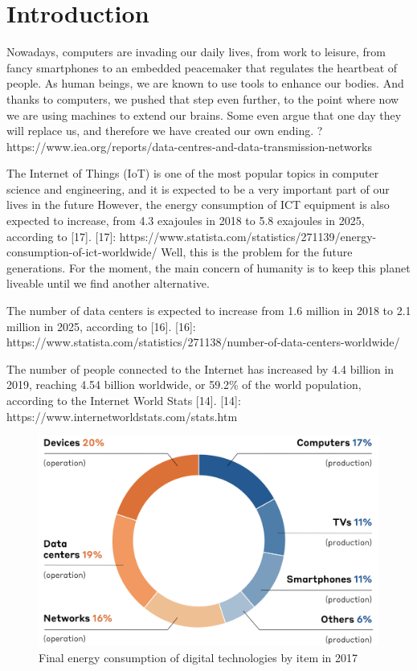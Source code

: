 \newpage

\chapter{Introduction }



\label{chapter:introduction}





Nowadays, computers are invading our daily lives, from work to leisure, from fancy smartphones to an embedded peacemaker that regulates the heartbeat of people.
As human beings, we are known to use tools to enhance our bodies. And thanks to computers, we pushed that step even further, to the point where now we are using machines to extend our brains. Some even argue that one day they will replace us, and therefore we have created our own ending.
?
https://www.iea.org/reports/data-centres-and-data-transmission-networks

The Internet of Things (IoT) is one of the most popular topics in computer science and engineering, and it is expected to be a very important part of our lives in the future
However, the energy consumption of ICT equipment is also expected to increase, from 4.3 exajoules in 2018 to 5.8 exajoules in 2025, according to [17].
[17]: https://www.statista.com/statistics/271139/energy-consumption-of-ict-worldwide/
Well, this is the problem for the future generations. For the moment, the main concern of humanity is to keep this planet liveable until we find another alternative.

The number of data centers is expected to increase from 1.6 million in 2018 to 2.1 million in 2025, according to [16].
[16]: https://www.statista.com/statistics/271138/number-of-data-centers-worldwide/

The number of people connected to the Internet has increased by 4.4 billion in 2019, reaching 4.54 billion worldwide, or 59.2\% of the world population, according to the Internet World Stats [14].
[14]: https://www.internetworldstats.com/stats.htm


\begin{figure}
    \includegraphics[width=\linewidth]{chapters/distribution_of_ict_consumption.png}
    \caption{Final energy consumption of digital technologies by item in 2017}
    \label{fig:soa_comparaisoncpu}
\end{figure}

